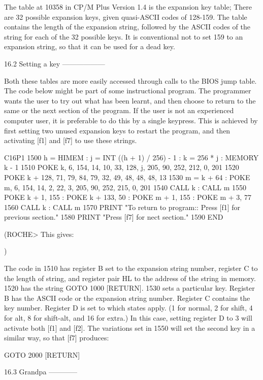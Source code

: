 The table at 10358 in CP/M Plus Version 1.4 is the expansion key table;  There 
are 32 possible expansion keys, given quasi-ASCII codes of 128-159. The  table 
contains  the length of the expansion string, followed by the ASCII  codes  of 
the string for each of the 32 possible keys. It is conventional not to set 159 
to an expansion string, so that it can be used for a dead key.


16.2 Setting a key
------------------

Both  these  tables are more easily accessed through calls to  the  BIOS  jump 
table.  The  code  below  might be part of  some  instructional  program.  The 
programmer wants the user to try out what has been learnt, and then choose  to 
return  to the same or the next section of the program. If the user is not  an 
experienced  computer user, it is preferable to do this by a single  keypress. 
This  is  achieved by first setting two unused expansion keys to  restart  the 
program, and then activating [f1] and [f7] to use these strings.

        C16P1
        1500 h = HIMEM : j = INT ((h + 1) / 256) - 1 : k = 256 * j : MEMORY  k 
- 1
        1510 POKE k, 6, 154, 14, 10, 33, 128, j, 205, 90, 252, 212, 0, 201
        1520 POKE k + 128, 71, 79, 84, 79, 32, 49, 48, 48, 48, 13
        1530 m = k + 64 : POKE m, 6, 154, 14, 2, 22, 3, 205, 90, 252, 215,  0, 
201
        1540 CALL k : CALL m
        1550  POKE k + 1, 155 : POKE k + 133, 50 : POKE m + 1, 155 : POKE m  + 
3, 77
        1560 CALL k : CALL m
        1570 PRINT "To return to program:: Press [f1] for previous section."
        1580 PRINT "Press [f7] for nect section."
        1590 END

(ROCHE> This gives:

$$$$
)

The code in 1510 has register B set to the expansion string number, register C 
to the length of string, and register pair HL to the address of the string  in 
memory.  1520 has the string GOTO 1000 [RETURN]. 1530 sets a  particular  key. 
Register  B  has  the ASCII code or the expansion string  number.  Register  C 
contains  the  key  number. Register D is set to which states  apply.  (1  for 
normal,  2 for shift, 4 for alt, 8 for shift-alt, and 16 for extra.)  In  this 
case, setting register D to 3 will activate both [f1] and [f2]. The variations 
set in 1550 will set the second key in a similar way, so that [f7] produces:

        GOTO 2000 [RETURN]


16.3 Grandpa
------------

